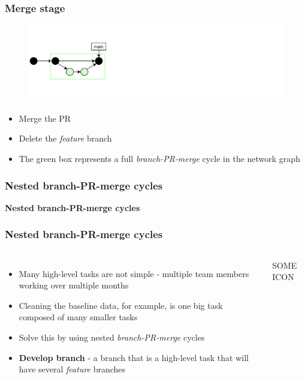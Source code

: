 \documentclass[aspectratio=169]{beamer} %
\begin{document}
\begin{frame}
	\frametitle{Merge stage}

	\vspace{-.5cm}
	\begin{minipage}[t][5cm][t]{\textwidth}
		\begin{figure}
			\centering
			\includegraphics[width=\textwidth]{./img/dime-gitflow-network-1-3.png}
		\end{figure}
	\end{minipage}

	\vspace{-.5cm}
	\begin{minipage}[t][5cm][t]{\textwidth}
		\begin{itemize}
			\setlength\itemsep{.5em}
			\item Merge the PR
			\item Delete the \textit{feature} branch
			\item The green box represents
			a full \textit{branch-PR-merge} cycle in the network graph
		\end{itemize}
	\end{minipage}

\end{frame}

\begin{frame}
	\frametitle{Nested branch-PR-merge cycles}

	\huge\centering \textbf{Nested branch-PR-merge cycles}

\end{frame}

\begin{frame}
	\frametitle{Nested branch-PR-merge cycles}
	\begin{columns}[c]

		\begin{itemize}
			\setlength\itemsep{.5em}
			\item Many high-level tasks are not simple
			- multiple team members working over multiple months
			\item Cleaning the baseline data,
			for example, is one big task composed of many smaller tasks
			\item Solve this by using nested \textit{branch-PR-merge} cycles
			\item \textbf{Develop branch}
			- a branch that is a high-level task that
			will have several \textit{feature} branches
		\end{itemize}

		\vspace{-.75cm}
		\Large SOME ICON
	\end{columns}
\end{frame}
\end{document}
